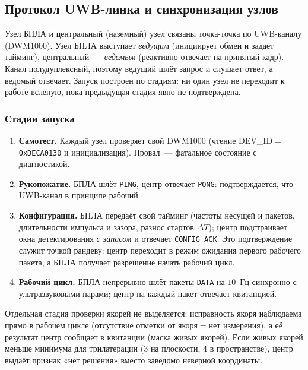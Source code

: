 \documentclass[a4paper,11pt]{article} %
\begin{document}
\FloatBarrier

\subsection{Протокол UWB-линка и синхронизация узлов}
\label{sec:protocol}

Узел БПЛА и центральный (наземный) узел связаны точка-точка по UWB-каналу
(DWM1000). Узел БПЛА выступает \emph{ведущим} (инициирует обмен и задаёт тайминг),
центральный~--- \emph{ведомым} (реактивно отвечает на принятый кадр). Канал
полудуплексный, поэтому ведущий шлёт запрос и слушает ответ, а ведомый отвечает.
Запуск построен по стадиям: ни один узел не переходит к работе вслепую, пока
предыдущая стадия явно не подтверждена.

\subsubsection{Стадии запуска}

\begin{enumerate}
\item \textbf{Самотест.} Каждый узел проверяет свой DWM1000 (чтение
  DEV\_ID${=}$\texttt{0xDECA0130} и инициализация). Провал~--- фатальное состояние
  с диагностикой.
\item \textbf{Рукопожатие.} БПЛА шлёт \texttt{PING}, центр отвечает \texttt{PONG}:
  подтверждается, что UWB-канал в принципе рабочий.
\item \textbf{Конфигурация.} БПЛА передаёт свой тайминг (частоты несущей и пакетов,
  длительности импульса и зазора, разнос стартов $\Delta T$); центр подстраивает
  окна детектирования \emph{с запасом} и отвечает \texttt{CONFIG\_ACK}. Это
  подтверждение служит точкой рандеву: центр переходит в режим ожидания первого
  рабочего пакета, а БПЛА получает разрешение начать рабочий цикл.
\item \textbf{Рабочий цикл.} БПЛА непрерывно шлёт пакеты \texttt{DATA} на $10$~Гц
  синхронно с ультразвуковыми парами; центр на каждый пакет отвечает квитанцией.
\end{enumerate}

Отдельная стадия проверки якорей не выделяется: исправность якоря наблюдаема прямо
в рабочем цикле (отсутствие отметки от якоря${=}$нет измерения), а её результат
центр сообщает в квитанции (маска живых якорей). Если живых якорей меньше минимума
для трилатерации ($3$ на плоскости, $4$ в пространстве), центр выдаёт признак
«нет решения» вместо заведомо неверной координаты.
\end{document}
